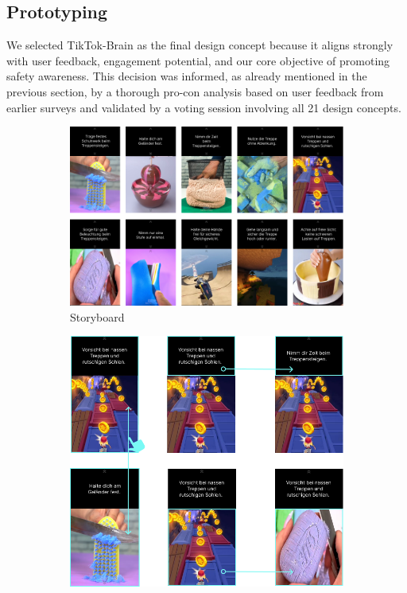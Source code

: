 \documentclass{article}
\begin{document}
\subsection{Prototyping}

We selected TikTok-Brain as the final design concept because it aligns strongly with user feedback,
engagement potential, and our core objective of promoting safety awareness.
This decision was informed, as already mentioned in the previous section,
by a thorough pro-con analysis based on user feedback from earlier surveys
and validated by a voting session involving all 21 design concepts.

\pagebreak

\begin{figure}[H]
    \centering
    \begin{subfigure}[H]{0.9\textwidth}
        \centering
        \includegraphics[width=\textwidth]{./resources/storyboard.png}
        \caption{Storyboard}
    \end{subfigure}
    \begin{subfigure}[H]{0.9\textwidth}
        \vspace{3mm}
        \centering
        \includegraphics[width=\textwidth]{./resources/full-system.png}

\end{subfigure}
\end{figure}
\end{document}
